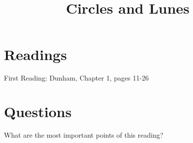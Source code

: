 \documentclass{ximera}
\title{Circles and Lunes}
\begin{document}
\begin{abstract}
\end{abstract}
\maketitle






\section{Readings}

First Reading: Dunham, Chapter 1, pages 11-26






\section{Questions}




\begin{question}
What are the most important points of this reading?
\begin{freeResponse}
\end{freeResponse}
\end{question}
\end{document}
